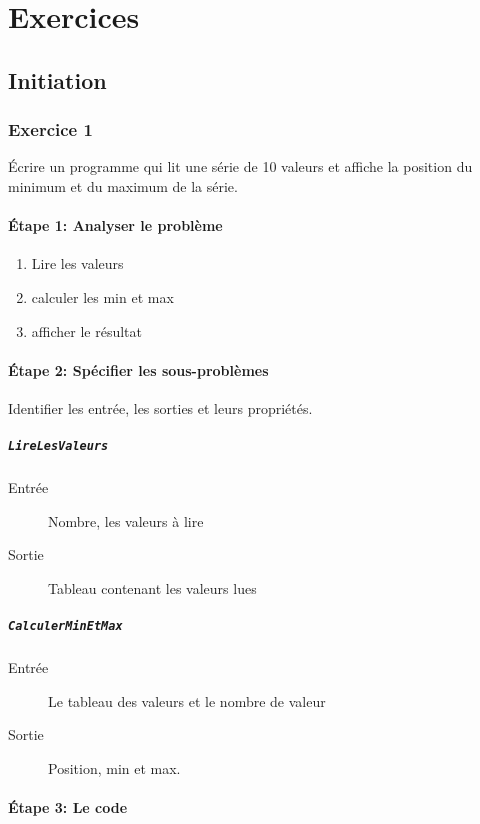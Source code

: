 \chapter{Exercices}
\section{Initiation}
	\subsection{Exercice 1}
\'Ecrire un programme qui lit une série de 10 valeurs et affiche la position du minimum et du maximum de la série.
\subsubsection{\'Etape 1: Analyser le problème}
\begin{enumerate}
	\item Lire les valeurs
	\item calculer les min et max
	\item afficher le résultat
\end{enumerate}
\subsubsection{\'Etape 2: Spécifier les sous-problèmes}
Identifier les entrée, les sorties et leurs propriétés.
\paragraph{\texttt{LireLesValeurs}}
\begin{description}
	\item[Entrée] Nombre, les valeurs à lire
	\item[Sortie] Tableau contenant les valeurs lues
\end{description}
\paragraph{\texttt{CalculerMinEtMax}}
\begin{description}
	\item[Entrée] Le tableau des valeurs et le nombre de valeur 
	\item[Sortie] Position, min et max. 
\end{description}
\newpage
\subsubsection{\'Etape 3: Le code}

\newpage
